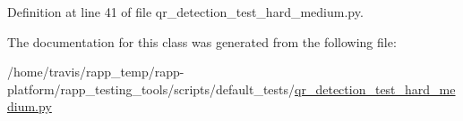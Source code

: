 Definition at line 41 of file qr\-\_\-detection\-\_\-test\-\_\-hard\-\_\-medium.\-py.



The documentation for this class was generated from the following file\-:\begin{DoxyCompactItemize}
\item 
/home/travis/rapp\-\_\-temp/rapp-\/platform/rapp\-\_\-testing\-\_\-tools/scripts/default\-\_\-tests/\hyperlink{qr__detection__test__hard__medium_8py}{qr\-\_\-detection\-\_\-test\-\_\-hard\-\_\-medium.\-py}\end{DoxyCompactItemize}
